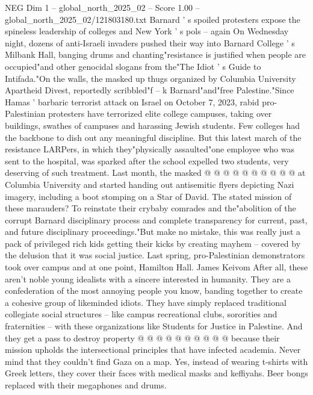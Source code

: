 \begin{textsample}{NEG Dim 1 – global\_north\_2025\_02 – Score 1.00 – global\_north\_2025\_02/121803180.txt}  \label{ex:f1_neg_001}
Barnard ' s spoiled protesters expose the spineless leadership of colleges and New York ' s pols -- again On Wednesday night, dozens of anti-Israeli invaders pushed their way into Barnard College ' s Milbank Hall, banging drums and chanting"resistance is justified when people are occupied"and other genocidal slogans from the"The Idiot ' s Guide to Intifada."On the walls, the masked up thugs organized by Columbia University Apartheid Divest, reportedly scribbled"f -- k Barnard"and"free Palestine."Since Hamas ' barbaric terrorist attack on Israel on October 7, 2023, rabid pro-Palestinian protesters have terrorized elite college campuses, taking over buildings, swathes of campuses and harassing Jewish students.
Few colleges had the backbone to dish out any meaningful discipline.
But this latest march of the resistance LARPers, in which they"physically assaulted"one employee who was sent to the hospital, was sparked after the school expelled two students, very deserving of such treatment.
Last month, the masked @ @ @ @ @ @ @ @ @ @ at Columbia University and started handing out antisemitic flyers depicting Nazi imagery, including a boot stomping on a Star of David.
The stated mission of these marauders?
To reinstate their crybaby comrades and the"abolition of the corrupt Barnard disciplinary process and complete transparency for current, past, and future disciplinary proceedings."But make no mistake, this was really just a pack of privileged rich kids getting their kicks by creating mayhem -- covered by the delusion that it was social justice.
Last spring, pro-Palestinian demonstrators took over campus and at one point, Hamilton Hall.
James Keivom After all, these aren't noble young idealists with a sincere interested in humanity.
They are a confederation of the most annoying people you know, banding together to create a cohesive group of likeminded idiots.
They have simply replaced traditional collegiate social structures -- like campus recreational clubs, sororities and fraternities -- with these organizations like Students for Justice in Palestine.
And they get a pass to destroy property @ @ @ @ @ @ @ @ @ @ because their mission upholds the intersectional principles that have infected academia.
Never mind that they couldn't find Gaza on a map.
Yes, instead of wearing t-shirts with Greek letters, they cover their faces with medical masks and keffiyahs.
Beer bongs replaced with their megaphones and drums.

\end{textsample}
